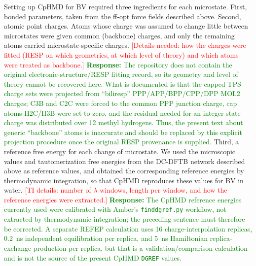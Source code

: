 Setting up CpHMD for BV required three ingredients for each microstate.
First, bonded parameters, taken from the ff-opt force fields described above.\cite{curtisRobustAutomatedForce2026}
Second, atomic point charges.
Atoms whose charge was assumed to change little between microstates were given common (backbone) charges, and only the remaining atoms carried microstate-specific charges.
\textcolor{red}{[Details needed: how the charges were fitted (RESP on which geometries, at which level of theory) and which atoms were treated as backbone.]}
\textcolor{green}{\textbf{Response:} The repository does not contain the original electronic-structure/RESP fitting record, so its geometry and level of theory cannot be recovered here. What is documented is that the capped TPS charge sets were projected from ``biliresp'' PPP/APP/BPP/CPP/DPP MOL2 charges; C3B and C2C were forced to the common PPP junction charge, cap atoms H2C/H3B were set to zero, and the residual needed for an integer state charge was distributed over 12 methyl hydrogens. Thus, the present text about generic ``backbone'' atoms is inaccurate and should be replaced by this explicit projection procedure once the original RESP provenance is supplied.}
Third, a reference free energy for each change of microstate.
We used the microscopic \pka{} values and tautomerization free energies from the DC-DFTB network described above as reference values, and obtained the corresponding reference energies by thermodynamic integration, so that CpHMD reproduces these values for BV in water.
\textcolor{red}{[TI details: number of $\lambda$ windows, length per window, and how the reference energies were extracted.]}
\textcolor{green}{\textbf{Response:} The CpHMD reference energies currently used were calibrated with Amber's \texttt{finddgref.py} workflow, not extracted by thermodynamic integration; the preceding sentence must therefore be corrected. A separate REFEP calculation uses 16 charge-interpolation replicas, 0.2~ns independent equilibration per replica, and 5~ns Hamiltonian replica-exchange production per replica, but that is a validation/comparison calculation and is not the source of the present CpHMD \texttt{DGREF} values.}

